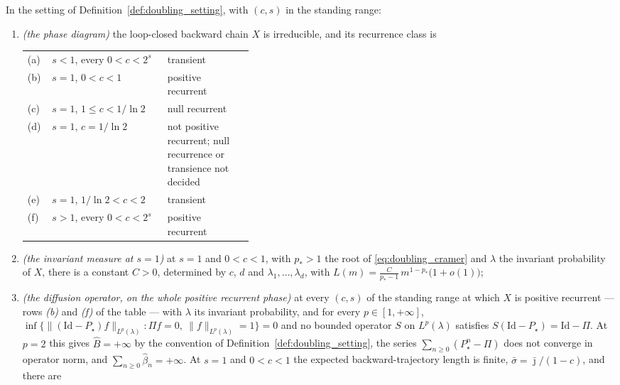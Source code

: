 \begin{theorem}\label{theo:doubling_main}
In the setting of Definition~\ref{def:doubling_setting}, with $(c,s)$ in the standing range:
\begin{enumerate}
    \item \emph{(the phase diagram)} the loop-closed backward chain $X$ is irreducible, and its
    recurrence class is
    \begin{center}
    \normalfont
    \begin{tabular}{l@{\quad}l|p{0.38\linewidth}}
        (a) & $s<1$, every $0<c<2^s$   & transient \\
        (b) & $s=1$, $0<c<1$           & positive recurrent \\
        (c) & $s=1$, $1\leq c<1/\ln2$  & null recurrent \\
        (d) & $s=1$, $c=1/\ln2$        & not positive recurrent; null recurrence or
                                         transience not decided \\
        (e) & $s=1$, $1/\ln2<c<2$      & transient \\
        (f) & $s>1$, every $0<c<2^s$   & positive recurrent
    \end{tabular}
    \end{center}
    \item \emph{(the invariant measure at $s=1$)} at $s=1$ and $0<c<1$, with $p_*>1$ the root
    of \eqref{eq:doubling_cramer} and $\lambda$ the invariant probability of $X$, there is a
    constant $C>0$, determined by $c$, $d$ and $\lambda_1,\dots,\lambda_d$, with
    $L(m)=\frac{C}{p_*-1}\,m^{1-p_*}\bigl(1+o(1)\bigr)$;
    \item \emph{(the diffusion operator, on the whole positive recurrent phase)} at every
    $(c,s)$ of the standing range at which $X$ is positive recurrent --- rows \emph{(b)} and
    \emph{(f)} of the table --- with $\lambda$ its invariant probability, and for every
    $p\in[1,+\infty]$,
    $\inf\bigl\{\|(\mathrm{Id}-P_\star)f\|_{L^p(\lambda)}:\Pi f=0,\ \|f\|_{L^p(\lambda)}=1\bigr\}=0$
    and no bounded operator $S$ on $L^p(\lambda)$ satisfies
    $S(\mathrm{Id}-P_\star)=\mathrm{Id}-\Pi$. At $p=2$ this gives $\widehat B=+\infty$ by the
    convention of Definition~\ref{def:doubling_setting}, the series
    $\sum_{n\geq0}(P_\star^n-\Pi)$ does not converge in operator norm, and
    $\sum_{n\geq0}\widehat\beta_n=+\infty$. At $s=1$ and $0<c<1$ the expected
    backward-trajectory length is finite, $\bar\sigma=\bar\jmath/(1-c)$, and there are

\end{enumerate}
\end{theorem}
